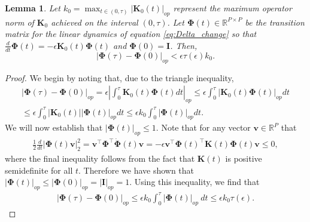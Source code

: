 \documentclass{article} %
\newtheorem{lemma}{Lemma}
\begin{document}
\begin{appendix}
\begin{lemma}\label{lemma:phase1}
    Let $k_0 = \max_{t \in (0,\tau)} |\bm K_0(t)|_{op}$ represent the maximum operator norm of $\bm K_0$ achieved on the interval $(0,\tau)$. Let $\bm \Phi(t) \in \mathbb{R}^{P\times P}$ be the transition matrix for the linear dynamics of equation \ref{eq:Delta_change} so that $\frac{d}{dt} \bm \Phi(t) = - \epsilon \bm K_0(t) \bm\Phi(t)$ and $\bm\Phi(0) = \bm I$. Then,
    \begin{equation}
        |\bm \Phi(\tau) - \bm \Phi(0)|_{op} < \epsilon \tau(\epsilon) k_0.
    \end{equation}
\end{lemma}
\begin{proof}
    We begin by noting that, due to the triangle inequality, 
    \begin{equation}
    \begin{aligned}
        |\bm\Phi(\tau) - \bm \Phi(0)|_{op} = \epsilon \left| \int_0^\tau  \bm K_0(t) \bm \Phi(t) dt \right|_{op} \leq \epsilon \int_0^\tau  \left| \bm K_0(t) \bm\Phi(t) \right|_{op} dt
        \\
        \leq \epsilon \int_0^\tau  \left| \bm K_0(t) \right| \left| \bm\Phi(t) \right|_{op} dt \leq \epsilon k_0 \int_0^\tau  \left| \bm\Phi(t) \right|_{op} dt.
    \end{aligned}
    \end{equation}
We will now establish that $|\bm\Phi(t)|_{op} \leq 1$. Note that for any vector $\bm v \in \mathbb{R}^P$ that
\begin{align}
    \frac{1}{2} \frac{d}{dt} |\bm\Phi(t) \bm v |_2^2 = \bm v^\top \bm \Phi^\top \dot{\bm\Phi}(t) \bm v =- \epsilon \bm v^\top \bm \Phi(t)^\top \bm K(t) \bm\Phi(t) \bm v \leq 0,
\end{align}
where the final inequality follows from the fact that $\bm K(t)$ is positive semidefinite for all $t$. Therefore we have shown that $|\bm \Phi(t)|_{op} \leq |\bm\Phi(0)|_{op} = |\bm I|_{op} = 1$. Using this inequality, we find that
\begin{align}
    |\bm\Phi(\tau) - \bm \Phi(0)|_{op} \leq \epsilon k_0 \int_0^\tau  |\bm\Phi(t)|_{op} \ dt \leq \epsilon k_0 \tau(\epsilon).
\end{align}
\end{proof}

\end{appendix}
\end{document}
